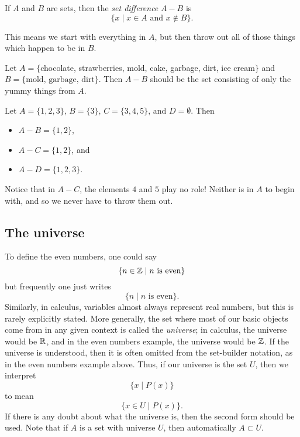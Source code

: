 \documentclass{tufte-book}
\begin{document}
\begin{definition}
  If $A$ and $B$ are sets, then the \emph{set difference} $A - B$ is 
  \[
  \{x \mid x \in A \text{ and } x \notin B\}.
  \]
\end{definition}
This means we start with everything in $A$, but then throw out all of those things which happen to be in $B$.

\begin{example}
  Let $A = \{$chocolate, strawberries, mold, cake, garbage, dirt, ice cream$\}$ and $B = \{\text{mold, garbage, dirt}\}$. Then $A - B$ should be the set consisting of only the yummy things from $A$.
\end{example}

\begin{example}
  Let $A = \{1, 2, 3\}$, $B = \{3\}$, $C = \{3, 4, 5\}$, and $D = \emptyset$. Then
  \begin{itemize}
      \item $A - B = \{1, 2\}$,
      \item $A - C = \{1, 2\}$, and
      \item $A - D = \{1, 2, 3\}$.
  \end{itemize}
  Notice that in $A - C$, the elements $4$ and $5$ play no role! Neither is in $A$ to begin with, and so we never have to throw them out.
\end{example}

\subsection{The universe}
\label{sec:universe}

To define the even numbers, one could say
\[
\{n \in \mathbb{Z}  \mid  n \text{ is even}\}
\]
but frequently one just writes
\[
\{n  \mid  n \text{ is even}\}.
\]
Similarly, in calculus, variables almost always represent real numbers, but this is rarely explicitly stated. More generally, the set where most of our basic objects come from in any given context is called the \emph{universe}; in calculus, the universe would be $\mathbb{R}$, and in the even numbers example, the universe would be $\mathbb{Z}$. If the universe is understood, then it is often omitted from the set-builder notation, as in the even numbers example above. Thus, if our universe is the set $U$, then we interpret
\[
\{x  \mid  P(x)\} 
\]
to mean
\[
\{x \in U  \mid  P(x)\}.
\]
If there is any doubt about what the universe is, then the second form should be used. Note that if $A$ is a set with universe $U$, then automatically $A \subset U$.
\end{document}
